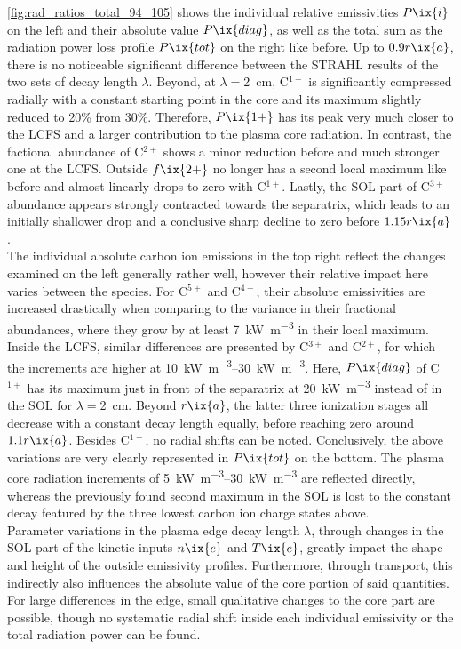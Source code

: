 %
                \cref{fig:rad_ratios_total_94_105} shows the individual relative emissivities $P\ix{i}$ on the left and their absolute value $P\ix{diag}$, as well as the total sum as the radiation power loss profile $P\ix{tot}$ on the right like before. Up to $0.9r\ix{a}$, there is no noticeable significant difference between the STRAHL results of the two sets of decay length $\lambda$. Beyond, at $\lambda=$\SI{2}{\centi\meter}, C$^{1+}$ is significantly compressed radially with a constant starting point in the core and its maximum slightly reduced to 20\% from 30\%. Therefore, $P\ix{1+}$ has its peak very much closer to the LCFS and a larger contribution to the plasma core radiation. In contrast, the factional abundance of C$^{2+}$ shows a minor reduction before and much stronger one at the LCFS. Outside  $f\ix{2+}$ no longer has a second local maximum like before and almost linearly drops to zero with C$^{1+}$. Lastly, the SOL part of C$^{3+}$ abundance appears strongly contracted towards the separatrix, which leads to an initially shallower drop and a conclusive sharp decline to zero before $1.15r\ix{a}$.\\%
                The individual absolute carbon ion emissions in the top right reflect the changes examined on the left generally rather well, however their relative impact here varies between the species. For C$^{5+}$ and C$^{4+}$, their absolute emissivities are increased drastically when comparing to the variance in their fractional abundances, where they grow by at least \SI{7}{\kilo\watt\per\cubic\meter} in their local maximum. Inside the LCFS, similar differences are presented by C$^{3+}$ and C$^{2+}$, for which the increments are higher at \SIrange{10}{30}{\kilo\watt\per\cubic\meter}. Here, $P\ix{diag}$ of C$^{1+}$ has its maximum just in front of the separatrix at \SI{20}{\kilo\watt\per\cubic\meter} instead of in the SOL for $\lambda=$\SI{2}{\centi\meter}. Beyond $r\ix{a}$, the latter three ionization stages all decrease with a constant decay length equally, before reaching zero around $1.1r\ix{a}$. Besides C$^{1+}$, no radial shifts can be noted. Conclusively, the above variations are very clearly represented in $P\ix{tot}$ on the bottom. The plasma core radiation increments of \SIrange{5}{30}{\kilo\watt\per\cubic\meter} are reflected directly, whereas the previously found second maximum in the SOL is lost to the constant decay featured by the three lowest carbon ion charge states above.\\%
                Parameter variations in the plasma edge decay length $\lambda$, through changes in the SOL part of the kinetic inputs $n\ix{e}$ and $T\ix{e}$, greatly impact the shape and height of the outside emissivity profiles. Furthermore, through transport, this indirectly also influences the absolute value of the core portion of said quantities. For large differences in the edge, small qualitative changes to the core part are possible, though no systematic radial shift inside each individual emissivity or the total radiation power can be found.%
%
